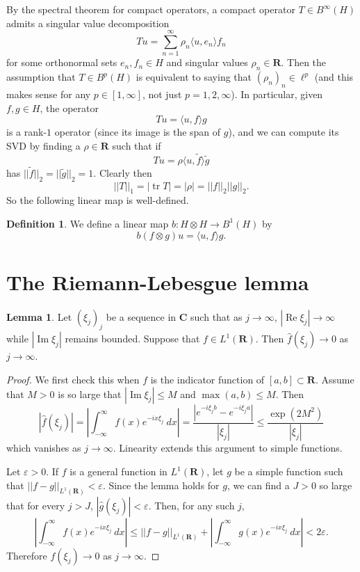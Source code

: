 \documentclass[12pt]{report}
\newcommand{\RR}{\mathbf{R}}
\newcommand{\CC}{\mathbf{C}}
\renewcommand{\Re}{\operatorname{Re}}
\renewcommand{\Im}{\operatorname{Im}}
\newcommand{\tr}{\operatorname{tr}}
\theoremstyle{definition}
\newtheorem{lemma}[theorem]{Lemma}
\newtheorem{definition}[theorem]{Definition}
\begin{document}
By the spectral theorem for compact operators, a compact operator $T \in B^\infty(H)$ admits a singular value decomposition
$$Tu = \sum_{n=1}^\infty \rho_n \langle u, e_n\rangle f_n$$
for some orthonormal sets $e_n,f_n \in H$ and singular values $\rho_n \in \RR$. Then the assumption that $T \in B^p(H)$ is equivalent to saying that $(\rho_n)_n \in \ell^p$ (and this makes sense for any $p \in [1, \infty]$, not just $p =1,2,\infty$). In particular, given $f, g \in H$, the operator
$$Tu = \langle u, f \rangle g$$
is a rank-$1$ operator (since its image is the span of $g$), and we can compute its SVD by finding a $\rho \in \RR$ such that if
$$Tu = \rho \langle u, \tilde f \rangle \tilde g$$
has $||\tilde f||_2 = ||\tilde g||_2 = 1$. Clearly then
\begin{equation}\label{b1 norm of a tensor product}||T||_1 = |\tr T| = |\rho| = ||f||_2 ||g||_2.\end{equation}
So the following linear map is well-defined.
\begin{definition}
\label{tensor products are trace class}
We define a linear map $b: H \otimes H \to B^1(H)$ by
$$b(f \otimes g)u = \langle u, f \rangle g.$$
\end{definition}

\section{The Riemann-Lebesgue lemma}
\begin{lemma}
\label{RiemannLebesgue}
Let $(\xi_j)_j$ be a sequence in $\CC$ such that as $j \to \infty$, $|\Re \xi_j| \to \infty$ while $|\Im \xi_j|$ remains bounded. Suppose that $f \in L^1(\RR)$. Then $\hat f(\xi_j) \to 0$ as $j \to \infty$.
\end{lemma}
\begin{proof}
We first check this when $f$ is the indicator function of $[a, b] \subset \RR$. Assume that $M > 0$ is so large that $|\Im \xi_j| \leq M$ and $\max(a, b) \leq M$. Then
$$|\hat f(\xi_j)| = \left|\int_{-\infty}^\infty f(x)e^{-ix\xi_j} ~dx\right| = \frac{|e^{-i\xi_jb} - e^{-i\xi_ja}|}{|\xi_j|} \leq \frac{\exp(2M^2)}{|\xi_j|}$$
which vanishes as $j \to \infty$. Linearity extends this argument to simple functions.

Let $\varepsilon > 0$. If $f$ is a general function in $L^1(\RR)$, let $g$ be a simple function such that $||f - g||_{L^1(\RR)} < \varepsilon$. Since the lemma holds for $g$, we can find a $J > 0$ so large that for every $j > J$, $|\hat g(\xi_j)| < \varepsilon$.
Then, for any such $j$,
$$\left|\int_{-\infty}^\infty f(x) e^{-ix\xi_j} ~dx\right| \leq ||f - g||_{L^1(\RR)} + \left|\int_{-\infty}^\infty g(x)e^{-ix\xi_j} ~dx\right| < 2\varepsilon.$$
Therefore $f(\xi_j) \to 0$ as $j \to \infty$.
\end{proof}
\end{document}
